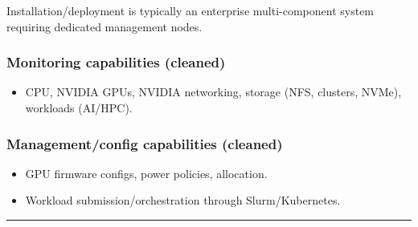 \documentclass[11pt]{article}
\newcommand{\blue}[1]{\textcolor{myblue}{#1}}
\newcommand{\notespace}{
\vspace{0.8cm}
\hrule
\vspace{0.8cm}
}
\begin{document}
Installation/deployment is typically an enterprise multi-component system requiring dedicated management nodes.

\subsubsection*{\blue{Monitoring capabilities (cleaned)}}
\begin{itemize}
\item CPU, NVIDIA GPUs, NVIDIA networking, storage (NFS, clusters, NVMe), workloads (AI/HPC).
\end{itemize}

\subsubsection*{\blue{Management/config capabilities (cleaned)}}
\begin{itemize}
\item GPU firmware configs, power policies, allocation.
\item Workload submission/orchestration through Slurm/Kubernetes.
\end{itemize}

\notespace


\end{document}
